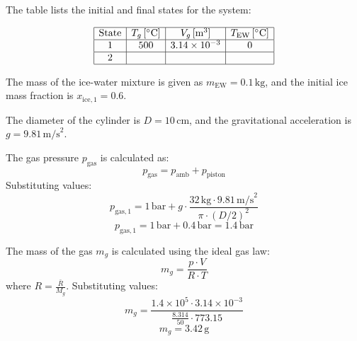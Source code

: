 The table lists the initial and final states for the system:  

\[
\begin{array}{|c|c|c|c|}
\hline
\text{State} & T_g \, [^\circ\text{C}] & V_g \, [\text{m}^3] & T_{\text{EW}} \, [^\circ\text{C}] \\
\hline
1 & 500 & 3.14 \times 10^{-3} & 0 \\
\hline
2 & & & \\
\hline
\end{array}
\]

The mass of the ice-water mixture is given as \( m_{\text{EW}} = 0.1 \, \text{kg} \), and the initial ice mass fraction is \( x_{\text{ice},1} = 0.6 \).  

The diameter of the cylinder is \( D = 10 \, \text{cm} \), and the gravitational acceleration is \( g = 9.81 \, \text{m/s}^2 \).  

The gas pressure \( p_{\text{gas}} \) is calculated as:  
\[
p_{\text{gas}} = p_{\text{amb}} + p_{\text{piston}}
\]
Substituting values:  
\[
p_{\text{gas},1} = 1 \, \text{bar} + g \cdot \frac{32 \, \text{kg} \cdot 9.81 \, \text{m/s}^2}{\pi \cdot (D/2)^2}
\]
\[
p_{\text{gas},1} = 1 \, \text{bar} + 0.4 \, \text{bar} = 1.4 \, \text{bar}
\]

The mass of the gas \( m_g \) is calculated using the ideal gas law:  
\[
m_g = \frac{p \cdot V}{R \cdot T}
\]
where \( R = \frac{\bar{R}}{M_g} \). Substituting values:  
\[
m_g = \frac{1.4 \times 10^5 \cdot 3.14 \times 10^{-3}}{\frac{8.314}{50} \cdot 773.15}
\]
\[
m_g = 3.42 \, \text{g}
\]